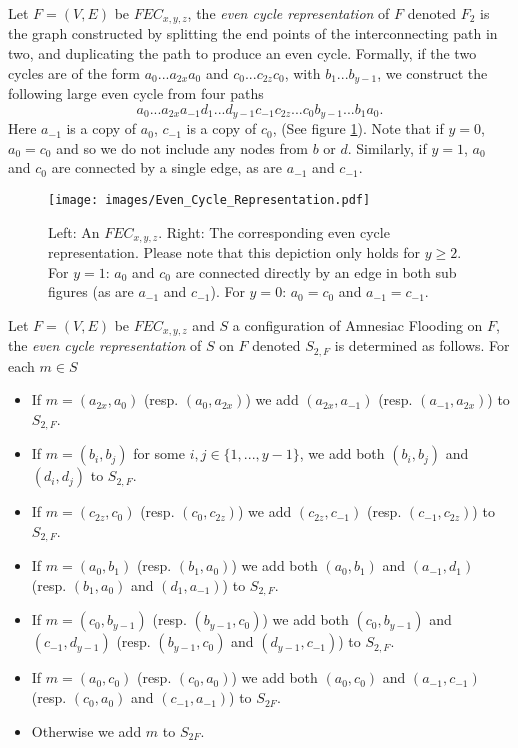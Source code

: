     \begin{definition}
        Let $F=(V,E)$ be $FEC_{x,y,z}$, the \emph{even cycle representation} of $F$ denoted $F_2$ is the graph constructed by splitting the end points of the interconnecting path in two, and duplicating the path to produce an even cycle. Formally, if the two cycles are of the form $a_0...a_{2x}a_0$ and $c_0...c_{2z}c_0$, with  $b_1...b_{y-1}$, we construct the following large even cycle from four paths $$a_0...a_{2x}a_{-1}d_1...d_{y-1}c_{-1}c_{2z}...c_0b_{y-1}...b_1a_0.$$ Here $a_{-1}$ is a copy of $a_0$, $c_{-1}$ is a copy of $c_0$,  (See figure \ref{fig: Even Cycle Representation}). Note that if $y=0$, $a_0=c_0$ and so we do not include any nodes from $b$ or $d$. Similarly, if $y=1$, $a_0$ and $c_0$ are connected by a single edge, as are $a_{-1}$ and $c_{-1}$.  
    \end{definition}
    \begin{figure}
        \centering
        \texttt{[image: images/Even\_Cycle\_Representation.pdf]}
        \caption{Left: An $FEC_{x,y,z}$. Right: The corresponding even cycle representation. Please note that this depiction only holds for $y\geq 2$. For $y=1$: $a_0$ and $c_0$ are connected directly by an edge in both sub figures (as are $a_{-1}$ and $c_{-1}$). For $y=0$: $a_0=c_0$ and $a_{-1}=c_{-1}$. }
        \label{fig: Even Cycle Representation}
    \end{figure}
    \begin{definition}
        Let $F=(V,E)$ be $FEC_{x,y,z}$ and $S$ a configuration of Amnesiac Flooding on $F$, the \emph{even cycle representation} of $S$ on $F$ denoted $S_{2,F}$ is determined as follows. For each $m \in S$
    \begin{itemize}
        \item If $m=(a_{2x},a_0)$ (resp. $(a_0,a_{2x})$) we add $(a_{2x},a_{-1})$ (resp. $(a_{-1},a_{2x})$) to $S_{2,F}$.
        \item If $m=(b_{i},b_{j})$ for some $i,j \in \{1,...,y-1\}$, we add both $(b_{i},b_{j})$ and $(d_i,d_j)$ to $S_{2,F}$.
        \item If $m=(c_{2z},c_0)$ (resp. $(c_0,c_{2z})$) we add $(c_{2z},c_{-1})$ (resp. $(c_{-1},c_{2z})$) to $S_{2,F}$.
        \item If $m=(a_0, b_1)$ (resp. $(b_1,a_0)$) we add both $(a_0,b_1)$ and $(a_{-1},d_1)$ (resp. $(b_1,a_0)$ and $(d_1,a_{-1})$) to $S_{2,F}$.
        \item If $m=(c_0, b_{y-1})$ (resp. $(b_{y-1},c_0)$) we add both $(c_0,b_{y-1})$ and $(c_{-1},d_{y-1})$ (resp. $(b_{y-1},c_0)$ and $(d_{y-1},c_{-1})$) to $S_{2,F}$.
        \item If $m=(a_0,c_0)$ (resp. $(c_0,a_0)$) we add both $(a_0,c_0)$ and $(a_{-1},c_{-1})$ (resp. $(c_{0},a_{0})$ and $(c_{-1},a_{-1})$) to $S_{2F}$.
        \item Otherwise we add $m$ to $S_{2F}$.
    \end{itemize}
    \end{definition}

